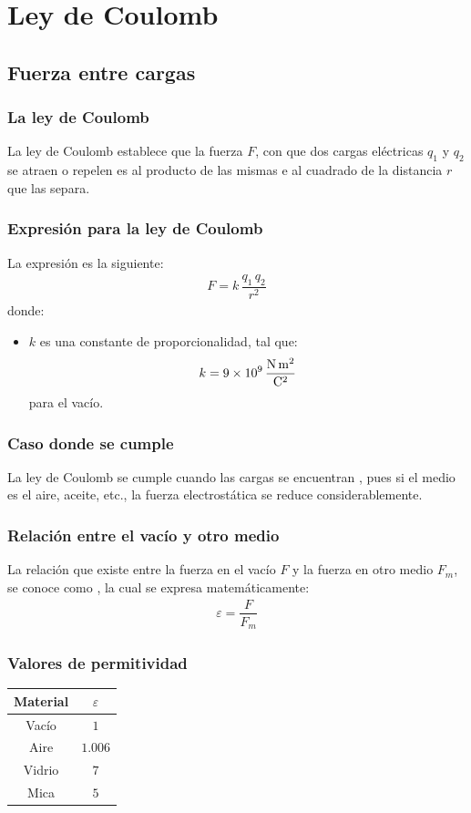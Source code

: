 \documentclass[14pt]{beamer}
\begin{document}
\section{Ley de Coulomb}
\subsection{Fuerza entre cargas}

\begin{frame}
\frametitle{La ley de Coulomb}
La ley de Coulomb establece que la fuerza $F$, con que dos cargas eléctricas $q_{1}$ y $q_{2}$ se atraen o repelen \pause es  al producto de las mismas \pause e  al cuadrado de la distancia $r$ que las separa.
\end{frame}
\begin{frame}
\frametitle{Expresión para la ley de Coulomb}
La expresión es la siguiente:
\pause
\begin{align*}
F = k \, \dfrac{q_{1} \, q_{2}}{r^{2}}
\end{align*}
donde:
\pause
\begin{itemize}[<+->]
\item $k$ es una constante de proporcionalidad, tal que:
\begin{align*}
k = \SI[per-mode=fraction]{9d9}{\newton\square\meter\per\square\coulomb}
\end{align*}
para el vacío.
\end{itemize}
\end{frame}
\begin{frame}
\frametitle{Caso donde se cumple}
La ley de Coulomb se cumple cuando las cargas se encuentran , \pause pues si el medio es el aire, aceite, etc., la fuerza electrostática se reduce considerablemente.
\end{frame}
\begin{frame}
\frametitle{Relación entre el vacío y otro medio}
La relación que existe entre la fuerza en el vacío $F$ y la fuerza en otro medio $F_{m}$, \pause se conoce como , la cual se expresa matemáticamente:
\pause
\begin{align*}
\varepsilon = \dfrac{F}{F_{m}}
\end{align*}
\end{frame}
\begin{frame}
\frametitle{Valores de permitividad}
\begin{table}
\centering
\begin{tabular}{c | c}
Material & $\varepsilon$ \\ \hline
Vacío & $1$ \\ \hline
Aire & $1.006$ \\ \hline
Vidrio & $7$ \\ \hline
Mica & $5$ \\ \hline    
\end{tabular}
\end{table}
\end{frame}
\end{document}
